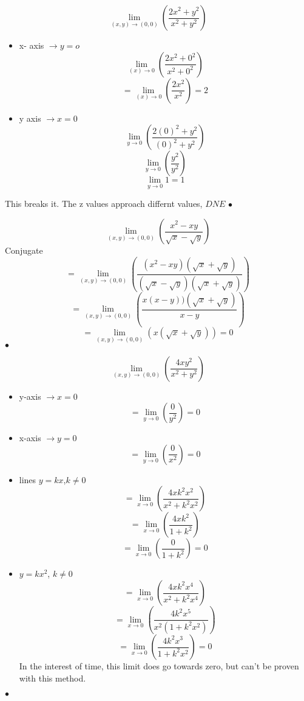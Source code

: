 \begin{example}
	\[\lim_{(x,y) \to (0,0)}\left( \frac{2x^2+y^2}{x^2+y^2} \right) \]
	\begin{itemize}
		\item x- axis $\to y = o$
	\[\lim_{(x) \to 0}\left( \frac{2x^2+0^2}{x^2+0^2} \right) \]
	\[=\lim_{(x) \to 0}\left( \frac{2x^2}{x^2} \right)  = 2\]
	\item y axis $\to x = 0$
		\[\lim_{y \to 0}\left( \frac{2(0)^2+y^2}{(0)^2+y^2} \right) \]
		\[\lim_{y \to 0}\left( \frac{y^2}{y^2} \right) \]
		\[\lim_{y \to 0}1 = 1 \]
	\end{itemize}
					This breaks it. The z values approach differnt values, $\boxed{DNE}$
\smallskip\hfill$\bullet$\end{example}

\begin{example}
	\[\lim_{(x,y) \to (0,0) }\left( \frac{x^2-xy}{\sqrt{x} -\sqrt{y} } \right) \]
	Conjugate
	\[=\lim_{(x,y) \to (0,0) }\left( \frac{(x^2-xy)(\sqrt{x} +\sqrt{y}) }{(\sqrt{x} -\sqrt{y}) (\sqrt{x} +\sqrt{y})} \right) \]
	\[=\lim_{(x,y) \to (0,0) }\left( \frac{x(x-y))(\sqrt{x} +\sqrt{y}) }{x-y} \right) \]
\[=\lim_{(x,y) \to (0,0) }\left(x(\sqrt{x} +\sqrt{y})\right) = \boxed{0} \]
\smallskip\hfill$\bullet$\end{example}

\begin{example}
	\[\lim_{(x,y) \to (0,0)}\left( \frac{4xy^2}{x^2+y^2} \right) \]
	\begin{itemize}
		\item y-axis $\to x=0$
	\[=\lim_{y \to 0}\left( \frac{0}{y^2} \right) = 0\]
		\item x-axis $\to y=0$
	\[=\lim_{y \to 0}\left( \frac{0}{x^2} \right) = 0\]
		\item lines $y=kx$,$k\neq 0$
	\[=\lim_{x \to 0}\left( \frac{4xk^2x^2}{x^2+k^2x^2} \right) \]
	\[=\lim_{x \to 0}\left( \frac{4xk^2}{1+k^2} \right)  \]
	\[=\lim_{x \to 0}\left( \frac{0}{1+k^2} \right) = 0 \]
	\item $y=kx^2$, $k\neq 0$
	\[=\lim_{x \to 0}\left( \frac{4xk^2x^4}{x^2+k^2x^4} \right) \]
	\[=\lim_{x \to 0}\left( \frac{4k^2x^5}{x^2(1+k^2x^2)} \right) \]
	\[=\lim_{x \to 0}\left( \frac{4k^2x^3}{1+k^2x^2} \right) = 0\]
	In the interest of time, this limit does go towards zero, but can't be proven with this method.
	\end{itemize}
\smallskip\hfill$\bullet$\end{example}

